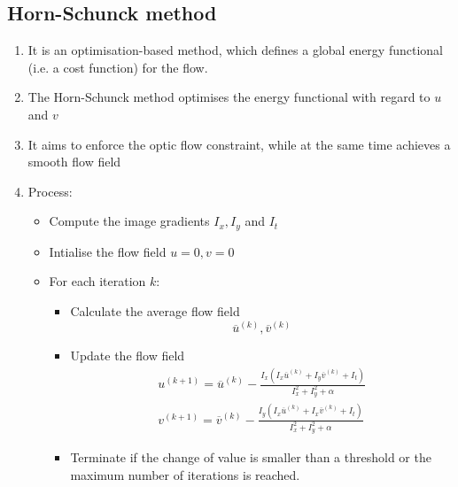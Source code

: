 \documentclass[9pt]{article}
\begin{document}
\begin{multicols*}{2}
    \subsection{Horn-Schunck method}
    \begin{enumerate}
        \item It is an optimisation-based method, which defines a global energy functional (i.e. a cost function) for the flow.
        \item The Horn-Schunck method optimises the energy functional with
        regard to $u$ and $v$
        \item It aims to enforce the optic flow constraint, while at the same time achieves 
        a smooth flow field
        \item Process:
        \begin{itemize}
            \item Compute the image gradients $I_x, I_y$ and $I_t$
            \item Intialise the flow field $u=0, v=0$
            \item For each iteration $k$:
            \begin{itemize}
                \item Calculate the average flow field 
                $$
                    \overline{u}^{(k)}, \overline{v}^{(k)}
                $$
                \item Update the flow field
                \begin{gather*}
                    u^{(k+1)} = \overline{u}^{(k)} - \frac{I_x (I_x \overline{u}^{(k)} + I_y \overline{v}^{(k)} + I_t)}{I_x^2 + I_y^2 + \alpha} \\
                    v^{(k+1)} = \overline{v}^{(k)} - \frac{I_y (I_x \overline{u}^{(k)} + I_x \overline{v}^{(k)} + I_t)}{I_x^2 + I_y^2 + \alpha}
                \end{gather*}

                \item Terminate if the change of value is smaller than a threshold or the maximum number 
                of iterations is reached.
            \end{itemize}
        \end{itemize}
    \end{enumerate}


\end{multicols*}
\end{document}
